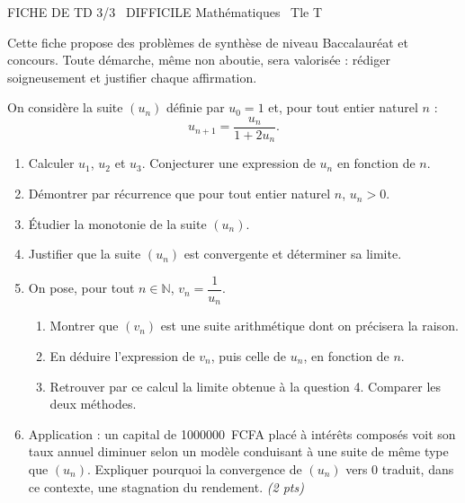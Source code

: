 \documentclass[11pt]{article}
\begin{document}
\begin{tcolorbox}[enhanced,colback=popink,colframe=popink,arc=10pt,boxrule=0pt,left=12pt,right=12pt,top=9pt,bottom=9pt]
{\color{white}\popxbold\small FICHE DE TD 3/3 \textbullet\ DIFFICILE \hfill Mathématiques \textbullet\ Tle T\par}
\end{tcolorbox}
\vspace{4pt}
Cette fiche propose des problèmes de synthèse de niveau Baccalauréat et concours. Toute démarche, même non aboutie, sera valorisée : rédiger soigneusement et justifier chaque affirmation.

\begin{exercice}
On considère la suite $(u_n)$ définie par $u_0 = 1$ et, pour tout entier naturel $n$ :
\[ u_{n+1} = \frac{u_n}{1 + 2u_n}. \]
\begin{enumerate}
\item Calculer $u_1$, $u_2$ et $u_3$. Conjecturer une expression de $u_n$ en fonction de $n$.
\item Démontrer par récurrence que pour tout entier naturel $n$, $u_n > 0$.
\item Étudier la monotonie de la suite $(u_n)$.
\item Justifier que la suite $(u_n)$ est convergente et déterminer sa limite.
\item On pose, pour tout $n \in \mathbb{N}$, $v_n = \dfrac{1}{u_n}$.
\begin{enumerate}
\item Montrer que $(v_n)$ est une suite arithmétique dont on précisera la raison.
\item En déduire l'expression de $v_n$, puis celle de $u_n$, en fonction de $n$.
\item Retrouver par ce calcul la limite obtenue à la question 4. Comparer les deux méthodes.
\end{enumerate}
\item Application : un capital de \SI{1000000}{FCFA} placé à intérêts composés voit son taux annuel diminuer selon un modèle conduisant à une suite de même type que $(u_n)$. Expliquer pourquoi la convergence de $(u_n)$ vers $0$ traduit, dans ce contexte, une stagnation du rendement. \emph{(2 pts)}
\end{enumerate}
\end{exercice}
\end{document}

